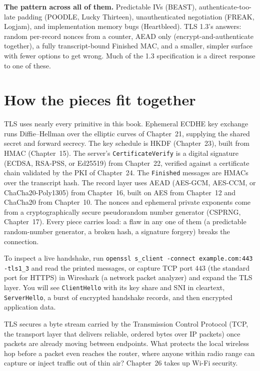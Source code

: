 \begin{focusbox}
\textbf{The pattern across all of them.} Predictable IVs (BEAST), authenticate-too-late
padding (POODLE, Lucky Thirteen), unauthenticated negotiation (FREAK, Logjam), and
implementation memory bugs (Heartbleed). TLS 1.3's answers: random per-record
nonces from a counter, AEAD only (encrypt-and-authenticate together), a fully
transcript-bound Finished MAC, and a smaller, simpler surface with fewer options to
get wrong. Much of the 1.3 specification is a direct response to one of these.
\end{focusbox}

\section{How the pieces fit together}

\begin{connectionbox}
TLS uses nearly every primitive in this book. Ephemeral ECDHE key exchange runs
Diffie--Hellman over the elliptic curves of Chapter~21, supplying the shared secret
and forward secrecy. The key schedule is HKDF (Chapter~23), built from HMAC
(Chapter~15). The server's \texttt{CertificateVerify} is a digital signature
(ECDSA, RSA-PSS, or Ed25519) from Chapter~22, verified against a certificate chain
validated by the PKI of Chapter~24. The \texttt{Finished} messages are HMACs over
the transcript hash. The record layer uses AEAD (AES-GCM, AES-CCM, or
ChaCha20-Poly1305) from Chapter~16, built on AES from Chapter~12 and ChaCha20 from
Chapter~10. The nonces and ephemeral private exponents come from a
cryptographically secure pseudorandom number generator (CSPRNG, Chapter~17). Every
piece carries load: a flaw in any one of them (a predictable random-number
generator, a broken hash, a signature forgery) breaks the connection.
\end{connectionbox}

\begin{marginnotebox}
To inspect a live handshake, run \texttt{openssl s\_client -connect example.com:443
-tls1\_3} and read the printed messages, or capture TCP port $443$ (the standard
port for HTTPS) in Wireshark (a network packet analyzer) and expand the TLS layer.
You will see \texttt{ClientHello} with its key share and SNI in cleartext,
\texttt{ServerHello}, a burst of encrypted handshake records, and then encrypted
application data.
\end{marginnotebox}

TLS secures a byte stream carried by the Transmission Control Protocol (TCP, the
transport layer that delivers reliable, ordered bytes over IP packets) once packets
are already moving between endpoints. What protects the local wireless hop before a
packet even reaches the router, where anyone within radio range can capture or
inject traffic out of thin air? Chapter~26 takes up Wi-Fi security.

